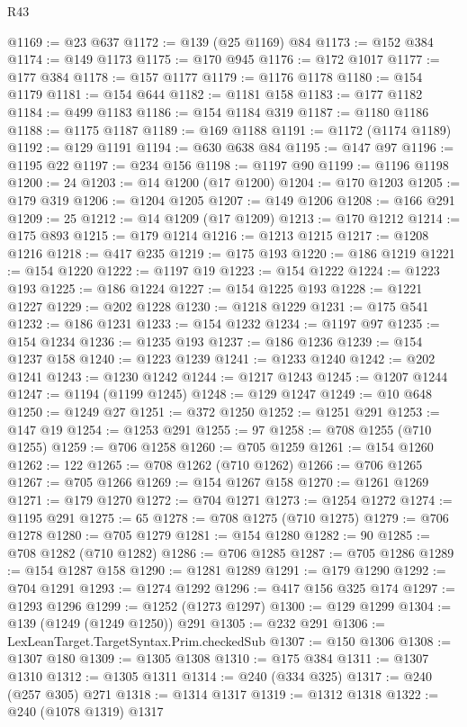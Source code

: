 \begin{lexlean}{R43}
\begin{coremodule}
@1169 := @23 @637
@1172 := @139 (@25 @1169) @84
@1173 := @152 @384
@1174 := @149 @1173
@1175 := @170 @945
@1176 := @172 @1017
@1177 := @177 @384
@1178 := @157 @1177
@1179 := @1176 @1178
@1180 := @154 @1179
@1181 := @154 @644
@1182 := @1181 @158
@1183 := @177 @1182
@1184 := @499 @1183
@1186 := @154 @1184 @319
@1187 := @1180 @1186
@1188 := @1175 @1187
@1189 := @169 @1188
@1191 := @1172 (@1174 @1189)
@1192 := @129 @1191
@1194 := @630 @638 @84
@1195 := @147 @97
@1196 := @1195 @22
@1197 := @234 @156
@1198 := @1197 @90
@1199 := @1196 @1198
@1200 := 24
@1203 := @14 @1200 (@17 @1200)
@1204 := @170 @1203
@1205 := @179 @319
@1206 := @1204 @1205
@1207 := @149 @1206
@1208 := @166 @291
@1209 := 25
@1212 := @14 @1209 (@17 @1209)
@1213 := @170 @1212
@1214 := @175 @893
@1215 := @179 @1214
@1216 := @1213 @1215
@1217 := @1208 @1216
@1218 := @417 @235
@1219 := @175 @193
@1220 := @186 @1219
@1221 := @154 @1220
@1222 := @1197 @19
@1223 := @154 @1222
@1224 := @1223 @193
@1225 := @186 @1224
@1227 := @154 @1225 @193
@1228 := @1221 @1227
@1229 := @202 @1228
@1230 := @1218 @1229
@1231 := @175 @541
@1232 := @186 @1231
@1233 := @154 @1232
@1234 := @1197 @97
@1235 := @154 @1234
@1236 := @1235 @193
@1237 := @186 @1236
@1239 := @154 @1237 @158
@1240 := @1223 @1239
@1241 := @1233 @1240
@1242 := @202 @1241
@1243 := @1230 @1242
@1244 := @1217 @1243
@1245 := @1207 @1244
@1247 := @1194 (@1199 @1245)
@1248 := @129 @1247
@1249 := @10 @648
@1250 := @1249 @27
@1251 := @372 @1250
@1252 := @1251 @291
@1253 := @147 @19
@1254 := @1253 @291
@1255 := 97
@1258 := @708 @1255 (@710 @1255)
@1259 := @706 @1258
@1260 := @705 @1259
@1261 := @154 @1260
@1262 := 122
@1265 := @708 @1262 (@710 @1262)
@1266 := @706 @1265
@1267 := @705 @1266
@1269 := @154 @1267 @158
@1270 := @1261 @1269
@1271 := @179 @1270
@1272 := @704 @1271
@1273 := @1254 @1272
@1274 := @1195 @291
@1275 := 65
@1278 := @708 @1275 (@710 @1275)
@1279 := @706 @1278
@1280 := @705 @1279
@1281 := @154 @1280
@1282 := 90
@1285 := @708 @1282 (@710 @1282)
@1286 := @706 @1285
@1287 := @705 @1286
@1289 := @154 @1287 @158
@1290 := @1281 @1289
@1291 := @179 @1290
@1292 := @704 @1291
@1293 := @1274 @1292
@1296 := @417 @156 @325 @174
@1297 := @1293 @1296
@1299 := @1252 (@1273 @1297)
@1300 := @129 @1299
@1304 := @139 (@1249 (@1249 @1250)) @291
@1305 := @232 @291
@1306 := LexLeanTarget.TargetSyntax.Prim.checkedSub
@1307 := @150 @1306
@1308 := @1307 @180
@1309 := @1305 @1308
@1310 := @175 @384
@1311 := @1307 @1310
@1312 := @1305 @1311
@1314 := @240 (@334 @325)
@1317 := @240 (@257 @305) @271
@1318 := @1314 @1317
@1319 := @1312 @1318
@1322 := @240 (@1078 @1319) @1317

\end{coremodule}
\end{lexlean}

